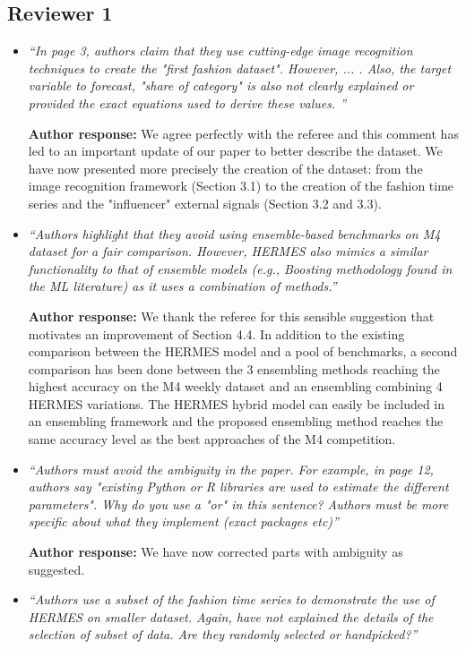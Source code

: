 \documentclass[11pt]{article}
\begin{document}
\subsection*{Reviewer 1}

\begin{itemize}
\item {\em ``In page 3, authors claim that they use cutting-edge image recognition techniques to create the "first fashion dataset". However, ... . Also, the target variable to forecast, "share of category" is also not clearly explained or provided the exact equations used to derive these values. ''} \medskip

\textbf{Author response:}  We agree perfectly with the referee and this comment has led to an important update of our paper to better describe the dataset. We have now presented more precisely the creation of the dataset: from the image recognition framework (Section 3.1) to the creation of the fashion time series and the "influencer" external signals (Section 3.2 and 3.3).

\item {\em ``Authors highlight that they avoid using ensemble-based benchmarks on M4 dataset for a fair comparison. However, HERMES also mimics a similar functionality to that of ensemble models (e.g., Boosting methodology found in the ML literature) as it uses a combination of methods.''} \medskip

\textbf{Author response:}  We thank the referee for this sensible suggestion that motivates an improvement of Section 4.4. In addition to the existing comparison between the HERMES model and a pool of benchmarks, a second comparison has been done between the 3 ensembling methods reaching the highest accuracy on the M4 weekly dataset and an ensembling combining 4 HERMES variations. The HERMES hybrid model can easily be included in an ensembling framework and the proposed ensembling method reaches the same accuracy level as the best approaches of the M4 competition.


\item {\em ``Authors must avoid the ambiguity in the paper. For example, in page 12, authors say "existing Python or R libraries are used to estimate the different parameters". Why do you use a "or" in this sentence? Authors must be more specific about what they implement (exact packages etc)''} \medskip

\textbf{Author response:}  We have now corrected parts with ambiguity as suggested.

\item {\em ``Authors use a subset of the fashion time series to demonstrate the use of HERMES on smaller dataset. Again, have not explained the details of the selection of subset of data. Are they randomly selected or handpicked?''} \medskip


\end{itemize}
\end{document}
